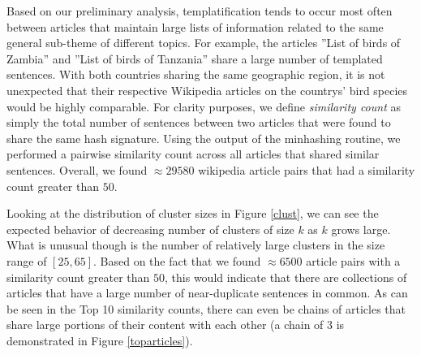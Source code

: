 \documentclass{acm_proc_article-sp}
\begin{document}
Based on our preliminary analysis, templatification tends to occur most often between articles that maintain large lists of information related to the same general sub-theme of different topics. For example, the articles ''List of birds of Zambia'' and ''List of birds of Tanzania'' share a large number of templated sentences. With both countries sharing the same geographic region, it is not unexpected that their respective Wikipedia articles on the countrys' bird species would be highly comparable. For clarity purposes, we define \emph{similarity count} as simply the total number of sentences between two articles that were found to share the same hash signature. Using the output of the minhashing routine, we performed a pairwise similarity count across all articles that shared similar sentences. Overall, we found $\approx 29580$ wikipedia article pairs that had a similarity count greater than $50$.

Looking at the distribution of cluster sizes in Figure \ref{clust}, we can see the expected behavior of decreasing number of clusters of size $k$ as $k$ grows large. What is unusual though is the number of relatively large clusters in the size range of $[25, 65]$. Based on the fact that we found $\approx 6500$ article pairs with a similarity count greater than $50$, this would indicate that there are collections of articles that have a large number of near-duplicate sentences in common. As can be seen in the Top 10 similarity counts, there can even be chains of articles that share large portions of their content with each other (a chain of 3 is demonstrated in Figure \ref{toparticles}).
\end{document}
